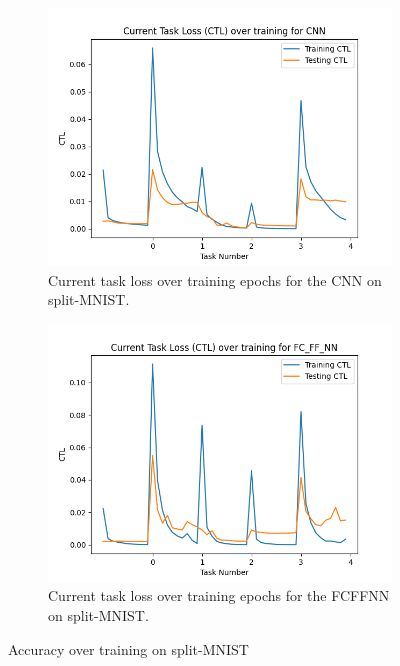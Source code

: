 \begin{figure}[htbp]
    \centering
    \begin{subfigure}[t]{0.45\linewidth}
      \centering
      \includegraphics[width=\textwidth]{images/MNIST_CL/CNN_CTL.png}
      \caption{Current task loss over training epochs for the CNN on split-MNIST.}
      \label{fig:MNIST-CL-CNN-CTL}
    \end{subfigure}
    \hspace{0.5cm}
    \begin{subfigure}[t]{0.45\linewidth}
      \centering
      \includegraphics[width=\textwidth]{images/MNIST_CL/FC_FF_NN_CTL.png}
      \caption{Current task loss over training epochs for the FCFFNN on split-MNIST.}
      \label{fig:MNIST-CL-FCFFNN-CTL}
    \end{subfigure}
    \caption{Accuracy over training on split-MNIST}
    \label{fig:MNIST-CL-CTL}
\end{figure}

